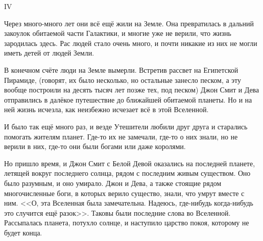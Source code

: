 \documentclass{article}
\begin{document}
$ $

\begin{center}
IV
\end{center}

Через много-много лет они всё ещё жили на Земле. Она превратилась в дальний закоулок обитаемой части Галактики, и многие уже не верили, что жизнь зародилась здесь. Рас людей стало очень много, и почти никакие из них не могли иметь детей от людей Земли. 

В конечном счёте люди на Земле вымерли. Встретив рассвет на Египетской Пирамиде, (говорят, их было несколько, но остальные занесло песком, а эту вообще построили на десять тысяч лет позже тех, под песком) Джон Смит и Дева отправились в далёкое путешествие до ближайшей обитаемой планеты. Но и на ней жизнь исчезла, как неизбежно исчезает всё в этой Вселенной. 

И было так ещё много раз, и везде Утешители любили друг друга и старались помогать жителям планет. Где-то их не замечали, где-то о них знали, но не верили в них, где-то они были богами или даже королями. 

Но пришло время, и Джон Смит с Белой Девой оказались на последней планете, летящей вокруг последнего солнца, рядом с последним живым существом. Оно было разумным, и оно умирало. Джон и Дева, а также стоящие рядом многочисленные боги, в которых верило существо, знали, что умрут вместе с ним. <<О, эта Вселенная была замечательна. Надеюсь, где-нибудь когда-нибудь это случится ещё разок>>. Таковы были последние слова во Вселенной. Рассыпалась планета, потухло солнце, и наступило царство покоя, которому не будет конца.
\end{document}
